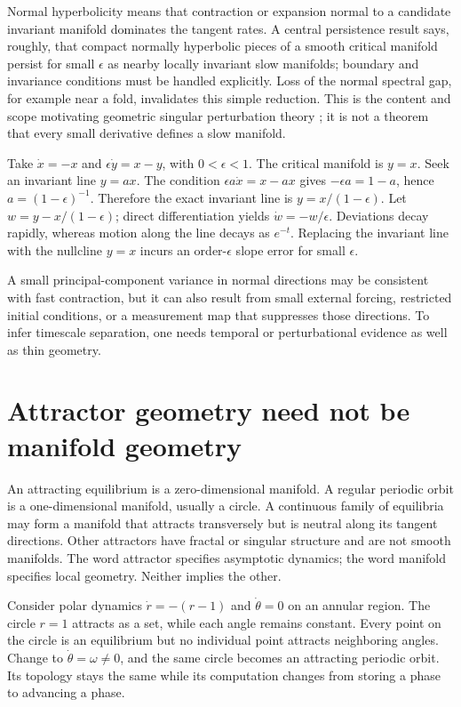 Normal hyperbolicity means that contraction or expansion normal to a candidate invariant manifold dominates the tangent rates. A central persistence result says, roughly, that compact normally hyperbolic pieces of a smooth critical manifold persist for small $\epsilon$ as nearby locally invariant slow manifolds; boundary and invariance conditions must be handled explicitly. Loss of the normal spectral gap, for example near a fold, invalidates this simple reduction. This is the content and scope motivating geometric singular perturbation theory \citep{fenichel1979}; it is not a theorem that every small derivative defines a slow manifold.

\begin{example}\label{ex:slow-graph}
Take $\dot x=-x$ and $\epsilon\dot y=x-y$, with $0<\epsilon<1$. The critical manifold is $y=x$. Seek an invariant line $y=ax$. The condition $\epsilon a\dot x=x-ax$ gives $-\epsilon a=1-a$, hence $a=(1-\epsilon)^{-1}$. Therefore the exact invariant line is $y=x/(1-\epsilon)$. Let $w=y-x/(1-\epsilon)$; direct differentiation yields $\dot w=-w/\epsilon$. Deviations decay rapidly, whereas motion along the line decays as $e^{-t}$. Replacing the invariant line with the nullcline $y=x$ incurs an order-$\epsilon$ slope error for small $\epsilon$.
\end{example}

A small principal-component variance in normal directions may be consistent with fast contraction, but it can also result from small external forcing, restricted initial conditions, or a measurement map that suppresses those directions. To infer timescale separation, one needs temporal or perturbational evidence as well as thin geometry.

\section{Attractor geometry need not be manifold geometry}
An attracting equilibrium is a zero-dimensional manifold. A regular periodic orbit is a one-dimensional manifold, usually a circle. A continuous family of equilibria may form a manifold that attracts transversely but is neutral along its tangent directions. Other attractors have fractal or singular structure and are not smooth manifolds. The word attractor specifies asymptotic dynamics; the word manifold specifies local geometry. Neither implies the other.

Consider polar dynamics $\dot r=-(r-1)$ and $\dot\theta=0$ on an annular region. The circle $r=1$ attracts as a set, while each angle remains constant. Every point on the circle is an equilibrium but no individual point attracts neighboring angles. Change to $\dot\theta=\omega\ne0$, and the same circle becomes an attracting periodic orbit. Its topology stays the same while its computation changes from storing a phase to advancing a phase.


